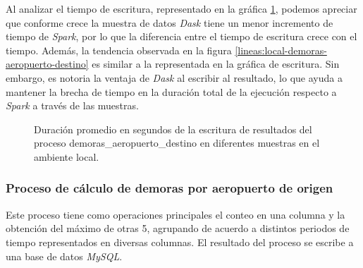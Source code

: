 Al analizar el tiempo de escritura, representado en la gráfica \ref{lineas:local-demoras-aeropuerto-destino-write}, podemos apreciar que conforme crece la muestra de datos \textit{Dask} tiene un menor incremento de tiempo de \textit{Spark}, por lo que la diferencia entre el tiempo de escritura crece con el tiempo. Además, la tendencia observada en la figura \ref{lineas:local-demoras-aeropuerto-destino} es similar a la representada en la gráfica de escritura. Sin embargo, es notoria la ventaja de \textit{Dask} al escribir al resultado, lo que ayuda a mantener la brecha de tiempo en la duración total de la ejecución respecto a \textit{Spark} a través de las muestras.

\begin{figure}
\centering
{}
\caption{Duración promedio en segundos de la escritura de resultados del proceso demoras\_aeropuerto\_destino en diferentes muestras en el ambiente local.}
\label{lineas:local-demoras-aeropuerto-destino-write}
\end{figure}

\subsubsection{Proceso de cálculo de demoras por aeropuerto de origen}

Este proceso tiene como operaciones principales el conteo en una columna y la obtención del máximo de otras 5, agrupando de acuerdo a distintos periodos de tiempo representados en diversas columnas. El resultado del proceso se escribe a una base de datos \textit{MySQL}.

